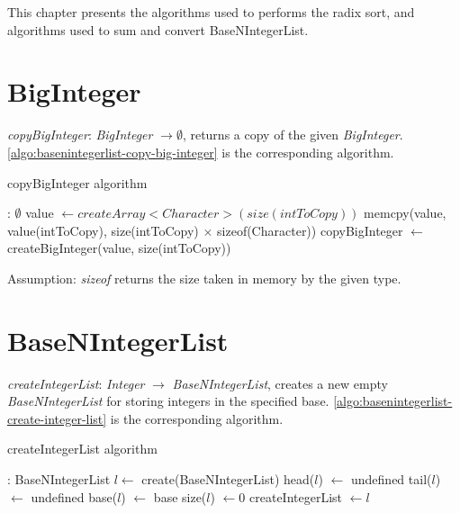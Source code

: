 \documentclass[book, nodocumentinfo]{upmethodology-document}
\begin{document}
This chapter presents the algorithms used to performs the
radix sort, and algorithms used to sum and convert BaseNIntegerList.

\section{BigInteger}

\emph{copyBigInteger}: \emph{BigInteger} \(\rightarrow \emptyset\),
    returns a copy of the given \emph{BigInteger}.
    \ref{algo:basenintegerlist-copy-big-integer} is the corresponding algorithm.

\begin{algorithm}[H]
    \caption{copyBigInteger algorithm}
    \label{algo:basenintegerlist-copy-big-integer}

    \begin{algorithmic}
         : \(\emptyset\)
        \State value \(\leftarrow createArray<Character>(size(intToCopy))\)
            \State memcpy(value, value(intToCopy), size(intToCopy) \(×\) sizeof(Character))
            \State copyBigInteger \(\leftarrow\) createBigInteger(value, size(intToCopy))
        \EndFunction
    \end{algorithmic}
\end{algorithm}

Assumption: \emph{sizeof} returns the size taken in memory by the given type.

\section{BaseNIntegerList}

\emph{createIntegerList}: \emph{Integer} \(\rightarrow\) \emph{BaseNIntegerList},
    creates a new empty \emph{BaseNIntegerList} for storing integers in the specified base.
    \ref{algo:basenintegerlist-create-integer-list} is the corresponding algorithm.

\begin{algorithm}[H]
    \caption{createIntegerList algorithm}
    \label{algo:basenintegerlist-create-integer-list}

    \begin{algorithmic}
         : BaseNIntegerList
            \State \(l \leftarrow\) create(BaseNIntegerList)
            \State head(\(l\)) \(\leftarrow\) undefined
            \State tail(\(l\)) \(\leftarrow\) undefined
            \State base(\(l\)) \(\leftarrow\) base
            \State size(\(l\)) \(\leftarrow 0\)
            \State createIntegerList \(\leftarrow l\)
        \EndFunction
    \end{algorithmic}
\end{algorithm}
\end{document}
